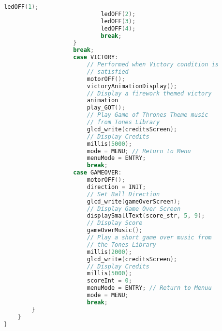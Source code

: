 \documentclass{article}
\begin{document}
\begin{lstlisting}[basicstyle = \small, language = C]
                            ledOFF(1);
                            ledOFF(2);
                            ledOFF(3);
                            ledOFF(4);
                            break;
                    }
                    break;
                    case VICTORY:
                        // Performed when Victory condition is 
                        // satisfied
                        motorOFF();
                        victoryAnimationDisplay(); 
                        // Display a firework themed victory
                        animation
                        play_GOT(); 
                        // Play Game of Thrones Theme music 
                        // from Tones Library
                        glcd_write(creditsScreen); 
                        // Display Credits
                        millis(5000);
                        mode = MENU; // Return to Menu
                        menuMode = ENTRY;
                        break;
                    case GAMEOVER:
                        motorOFF();
                        direction = INIT; 
                        // Set Ball Direction
                        glcd_write(gameOverScreen); 
                        // Display Game Over Screen
                        displaySmallText(score_str, 5, 9); 
                        // Display Score
                        gameOverMusic(); 
                        // Play a short game over music from 
                        // the Tones Library
                        millis(2000);
                        glcd_write(creditsScreen); 
                        // Display Credits
                        millis(5000);
                        scoreInt = 0;
                        menuMode = ENTRY; // Return to Menuu
                        mode = MENU;
                        break;
        }
    }
}
  \end{lstlisting}
  
\end{document}
